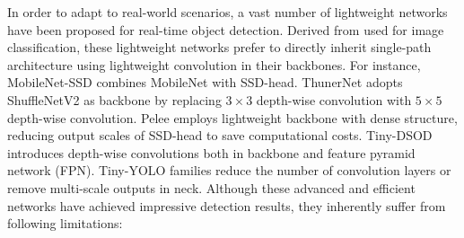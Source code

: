 \documentclass[lettersize,journal]{IEEEtran}
\begin{document}
In order to adapt to real-world scenarios, a vast number of lightweight networks \cite{howard2017mobilenets, sandler2018mobilenetv2,qin2019thundernet} have been proposed for real-time object detection. Derived from \cite{howard2017mobilenets, sandler2018mobilenetv2, ma2018shufflenet} used for image classification, these lightweight networks prefer to directly inherit single-path architecture using lightweight convolution in their backbones. For instance, MobileNet-SSD \cite{howard2017mobilenets,sandler2018mobilenetv2} combines MobileNet with SSD-head. ThunerNet \cite{qin2019thundernet} adopts ShuffleNetV2 \cite{ma2018shufflenet} as backbone by replacing $3\times3$ depth-wise convolution with $5\times5$ depth-wise convolution. Pelee \cite{Pelee} employs lightweight backbone with dense structure, reducing output scales of SSD-head to save computational costs. Tiny-DSOD \cite{li2018tiny} introduces depth-wise convolutions both in backbone and feature pyramid network (FPN). Tiny-YOLO families \cite{redmon2017yolo9000,redmon2018yolov3,wang2021scaled} reduce the number of convolution layers or remove multi-scale outputs in neck. Although these advanced and efficient networks have achieved impressive detection results, they inherently suffer from following limitations:
\end{document}
